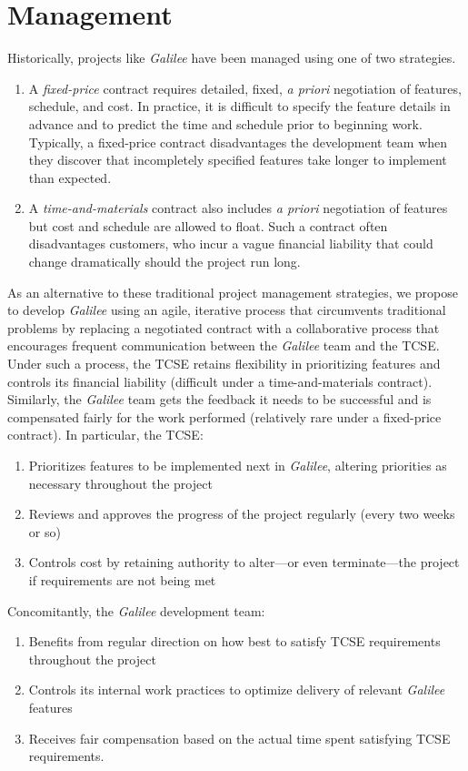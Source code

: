 \documentclass{article}
\newcommand{\gal}{\emph{Galilee}}
\newcommand{\tcse}{TCSE}
\begin{document}
\section{Management}
\label{sec:management}

Historically,
projects like \gal{} have been managed using one of two strategies.
\begin{enumerate}
\item A \emph{fixed-price} contract
  requires detailed, fixed, \emph{a priori} negotiation of
  features, schedule, and cost.
  In practice, it is difficult to specify the feature details in advance
  and to predict the time and schedule prior to beginning work.
  Typically, a fixed-price contract disadvantages the development team
  when they discover that incompletely specified features
  take longer to implement than expected.
\item A \emph{time-and-materials} contract
  also includes \emph{a priori} negotiation of features
  but cost and schedule are allowed to float.
  Such a contract often disadvantages customers,
  who incur a vague financial liability
  that could change dramatically should the project run long.
\end{enumerate}
As an alternative to these traditional project management strategies,
we propose to develop \gal{}
using an agile, iterative process
that circumvents traditional problems
by replacing a negotiated contract
with a collaborative process that
encourages frequent communication between the \gal{} team and the \tcse.
Under such a process,
the \tcse{} retains flexibility in prioritizing features
and controls its financial liability
(difficult under a time-and-materials contract).
Similarly, the \gal{} team gets the feedback it needs to be successful
and is compensated fairly for the work performed
(relatively rare under a fixed-price contract).
In particular, the \tcse{}:
\begin{enumerate}
\item Prioritizes features to be implemented next in \gal,
  altering priorities as necessary throughout the project
\item Reviews and approves the progress of the project
  regularly (every two weeks or so)
\item Controls cost by retaining authority to alter---or even terminate---the project
if requirements are not being met
\end{enumerate}
Concomitantly, the \gal{} development team:
\begin{enumerate}
\item Benefits from regular direction on how best
  to satisfy \tcse{} requirements throughout the project
\item Controls its internal work practices to optimize
  delivery of relevant \gal{} features
\item Receives fair compensation
  based on the actual time spent satisfying \tcse{} requirements.
\end{enumerate}
\end{document}
